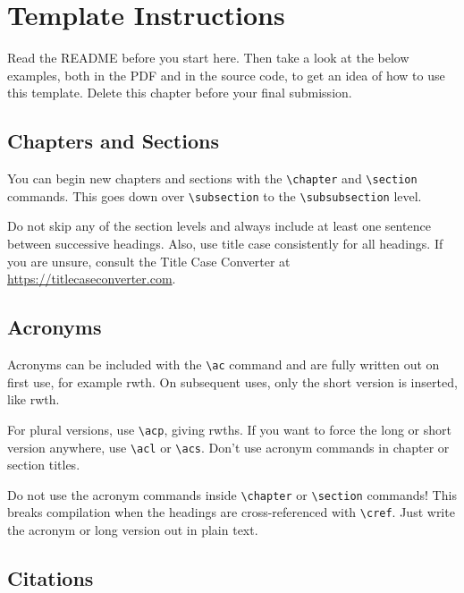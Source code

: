 
\setcounter{chapter}{-1}

\chapter{Template Instructions}
\label{ch:template-instructions}

Read the README before you start here. Then take a look at the below examples, both in the PDF and in the source code, to get an idea of how to use this template. Delete this chapter before your final submission.

\section{Chapters and Sections}
\label{sec:chapters-and-sections}

You can begin new chapters and sections with the \texttt{\textbackslash chapter} and \texttt{\textbackslash section} commands. This goes down over \texttt{\textbackslash subsection} to the \texttt{\textbackslash subsubsection} level.

Do not skip any of the section levels and always include at least one sentence between successive headings. Also, use title case consistently for all headings. If you are unsure, consult the Title Case Converter at \url{https://titlecaseconverter.com}.

\section{Acronyms}
\label{sec:acronyms}

Acronyms can be included with the \texttt{\textbackslash ac} command and are fully written out on first use, for example \ac{rwth}. On subsequent uses, only the short version is inserted, like \ac{rwth}.

For plural versions, use \texttt{\textbackslash acp}, giving \acp{rwth}. If you want to force the long or short version anywhere, use \texttt{\textbackslash acl} or \texttt{\textbackslash acs}. Don't use acronym commands in chapter or section titles.

Do not use the acronym commands inside \texttt{\textbackslash chapter} or \texttt{\textbackslash section} commands! This breaks compilation when the headings are cross-referenced with \texttt{\textbackslash cref}. Just write the acronym or long version out in plain text.

\section{Citations}
\label{sec:citations}

